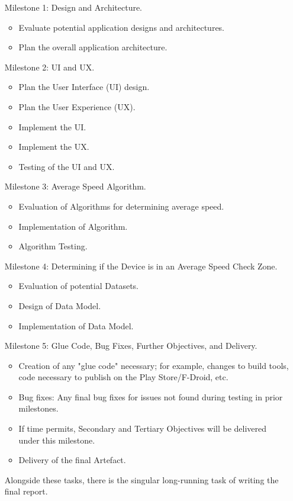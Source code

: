 \documentclass[11pt, a4paper, notitlepage]{report}
\begin{document}
\begin{enumerate}
    \item [Milestone 1:]Design and Architecture.
    \begin{itemize}
        \item Evaluate potential application designs and architectures.
        \item Plan the overall application architecture.
    \end{itemize}
    \item [Milestone 2:]UI and UX.
    \begin{itemize}
        \item Plan the User Interface (UI) design.
        \item Plan the User Experience (UX).
        \item Implement the UI.
        \item Implement the UX.
        \item Testing of the UI and UX.
    \end{itemize}
    \item [Milestone 3:]Average Speed Algorithm.
    \begin{itemize}
        \item Evaluation of Algorithms for determining average speed.
        \item Implementation of Algorithm.
        \item Algorithm Testing.
    \end{itemize}
    \item [Milestone 4:]Determining if the Device is in an Average Speed Check 
    Zone.
    \begin{itemize}
        \item Evaluation of potential Datasets.
        \item Design of Data Model.
        \item Implementation of Data Model.
    \end{itemize}
    \item [Milestone 5:]Glue Code, Bug Fixes, Further Objectives, and Delivery.
    \begin{itemize}
        \item Creation of any "glue code" necessary; for example, changes to 
        build tools, code necessary to publish on the Play Store/F-Droid, etc.
        \item Bug fixes: Any final bug fixes for issues not found during 
        testing in prior milestones.
        \item If time permits, Secondary and Tertiary Objectives will be 
        delivered under this milestone.
        \item Delivery of the final Artefact.
    \end{itemize}

Alongside these tasks, there is the singular long-running task of writing the 
final report.
\end{enumerate}
\end{document}
